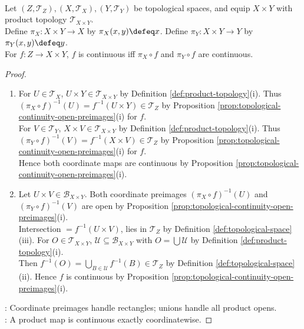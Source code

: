 \begin{proposition} \label{prop:product-topology-coordinate-continuity} \\
Let $(Z,\mathcal{T}_Z),(X,\mathcal{T}_X),(Y,\mathcal{T}_Y)$ be topological spaces, and equip $X\times Y$ with product topology $\mathcal{T}_{X\times Y}$.\\
Define $\pi_X:X\times Y\to X$ by $\pi_X(x,y)\defeq x$. Define $\pi_Y:X\times Y\to Y$ by $\pi_Y(x,y)\defeq y$.\\
For $f:Z\to X\times Y$, $f$ is continuous iff $\pi_X\circ f$ and $\pi_Y\circ f$ are continuous.
\begin{proof}
\begin{enumerate}[label=\roman*.]
\setlength{\itemsep}{0pt}
\item[$(\Rightarrow)$] For $U\in\mathcal{T}_X$, $U\times Y\in\mathcal{T}_{X\times Y}$ by Definition \ref{def:product-topology}(i). Thus $(\pi_X\circ f)^{-1}(U)=f^{-1}(U\times Y)\in\mathcal{T}_Z$ by Proposition \ref{prop:topological-continuity-open-preimages}(i) for $f$.\\
For $V\in\mathcal{T}_Y$, $X\times V\in\mathcal{T}_{X\times Y}$ by Definition \ref{def:product-topology}(i). Thus $(\pi_Y\circ f)^{-1}(V)=f^{-1}(X\times V)\in\mathcal{T}_Z$ by Proposition \ref{prop:topological-continuity-open-preimages}(i) for $f$.\\
Hence both coordinate maps are continuous by Proposition \ref{prop:topological-continuity-open-preimages}(i).
\item[$(\Leftarrow)$] Let $U\times V\in\mathcal{B}_{X\times Y}$. Both coordinate preimages $(\pi_X\circ f)^{-1}(U)$ and $(\pi_Y\circ f)^{-1}(V)$ are open by Proposition \ref{prop:topological-continuity-open-preimages}(i).\\
Intersection $= f^{-1}(U\times V)$, lies in $\mathcal{T}_Z$ by Definition \ref{def:topological-space}(iii). For $O\in\mathcal{T}_{X\times Y}$, $\mathcal{U}\subseteq\mathcal{B}_{X\times Y}$ with $O=\bigcup\mathcal{U}$ by Definition \ref{def:product-topology}(i).\\
Then $f^{-1}(O)=\bigcup\limits_{B\in\mathcal{U}}f^{-1}(B)\in\mathcal{T}_Z$ by Definition \ref{def:topological-space}(ii). Hence $f$ is continuous by Proposition \ref{prop:topological-continuity-open-preimages}(i).
\end{enumerate}
: Coordinate preimages handle rectangles; unions handle all product opens.\\
: A product map is continuous exactly coordinatewise.
\end{proof}
\end{proposition}

